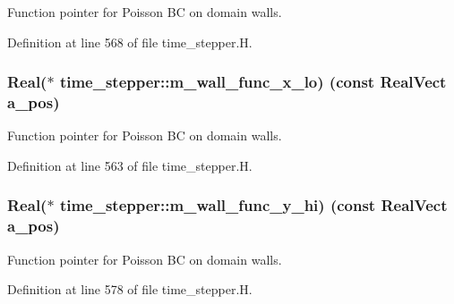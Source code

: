 Function pointer for Poisson BC on domain walls. 



Definition at line 568 of file time\+\_\+stepper.\+H.

\subsubsection[{\texorpdfstring{m\+\_\+wall\+\_\+func\+\_\+x\+\_\+lo}{m_wall_func_x_lo}}]{\setlength{\rightskip}{0pt plus 5cm}Real($\ast$ time\+\_\+stepper\+::m\+\_\+wall\+\_\+func\+\_\+x\+\_\+lo) (const Real\+Vect a\+\_\+pos)\hspace{0.3cm}{\ttfamily [protected]}}\hypertarget{classtime__stepper_a54c0d0fabecde28d2ff02ff25385bf43}{}\label{classtime__stepper_a54c0d0fabecde28d2ff02ff25385bf43}


Function pointer for Poisson BC on domain walls. 



Definition at line 563 of file time\+\_\+stepper.\+H.

\subsubsection[{\texorpdfstring{m\+\_\+wall\+\_\+func\+\_\+y\+\_\+hi}{m_wall_func_y_hi}}]{\setlength{\rightskip}{0pt plus 5cm}Real($\ast$ time\+\_\+stepper\+::m\+\_\+wall\+\_\+func\+\_\+y\+\_\+hi) (const Real\+Vect a\+\_\+pos)\hspace{0.3cm}{\ttfamily [protected]}}\hypertarget{classtime__stepper_a6bb898a547668fa17298cf85602f4391}{}\label{classtime__stepper_a6bb898a547668fa17298cf85602f4391}


Function pointer for Poisson BC on domain walls. 



Definition at line 578 of file time\+\_\+stepper.\+H.

